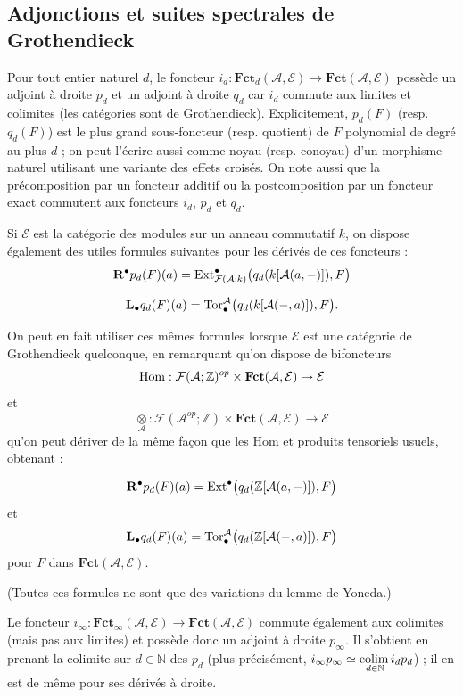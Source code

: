 \documentclass[a4paper,10pt]{article}
\newcommand{\A}{{\mathcal{A}}}
\newcommand{\F}{{\mathcal{F}}}
\newcommand{\fct}{\mathbf{Fct}}
\newcommand{\E}{{\mathcal{E}}}
\newcommand{\Pol}{\fct}
\newcommand{\col}{{\rm colim}\,}
\theoremstyle{definition}
\theoremstyle{remark}
\begin{document}
\subsection{Adjonctions et suites spectrales de Grothendieck}
Pour tout entier naturel $d$, le foncteur $i_d : \Pol_d(\A,\E)\to\fct(\A,\E)$ possède un adjoint à droite $p_d$ et un adjoint à droite $q_d$ car $i_d$ commute aux limites et colimites (les catégories sont de Grothendieck). Explicitement, $p_d(F)$ (resp. $q_d(F)$) est le plus grand sous-foncteur (resp. quotient) de $F$ polynomial de degré au plus $d$ ; on peut l'écrire aussi comme noyau (resp. conoyau) d'un morphisme naturel utilisant une variante des effets croisés. On note aussi que la précomposition par un foncteur additif ou la postcomposition par un foncteur exact commutent aux foncteurs $i_d$, $p_d$ et $q_d$.

Si $\E$ est la catégorie des modules sur un anneau commutatif $k$, on dispose également des utiles formules suivantes pour les dérivés de ces foncteurs :
\begin{equation}\label{eqa1}
\mathbf{R}^\bullet p_d(F)(a)={\rm Ext}^\bullet_{\F(\A;k)}\big(q_d(k[\A(a,-)]),F\big)
\end{equation}

\begin{equation}\label{eqa2}
\mathbf{L}_\bullet q_d(F)(a)={\rm Tor}_\bullet^\A\big(q_d(k[\A(-,a)]),F\big).
\end{equation}

On peut en fait utiliser ces mêmes formules lorsque $\E$ est une catégorie de Grothendieck quelconque, en remarquant qu'on dispose de bifoncteurs
$${\rm Hom} : \F(\A;\mathbb{Z})^{op}\times\fct(\A,\E)\to\E$$
et
$$\underset{\A}{\otimes} : \F(\A^{op};\mathbb{Z})\times\fct(\A,\E)\to\E$$
qu'on peut dériver de la même façon que les Hom et produits tensoriels usuels, obtenant :

\begin{equation}\label{eqa3}
\mathbf{R}^\bullet p_d(F)(a)={\rm Ext}^\bullet\big(q_d(\mathbb{Z}[\A(a,-)]),F\big)
\end{equation}
et
\begin{equation}\label{eqa4}
\mathbf{L}_\bullet q_d(F)(a)={\rm Tor}_\bullet^\A\big(q_d(\mathbb{Z}[\A(-,a)]),F\big)
\end{equation}
pour $F$ dans $\fct(\A,\E)$.

(Toutes ces formules ne sont que des variations du lemme de Yoneda.)

\smallskip

Le foncteur $i_\infty : \Pol_\infty(\A,\E)\to\fct(\A,\E)$ commute également aux colimites (mais pas aux limites) et possède donc un adjoint à droite $p_\infty$. Il s'obtient en prenant la colimite sur $d\in\mathbb{N}$ des $p_d$ (plus précisément, $i_\infty p_\infty\simeq\underset{d\in\mathbb{N}}{\col}i_d p_d$) ; il en est de même pour ses dérivés à droite.
\end{document}
